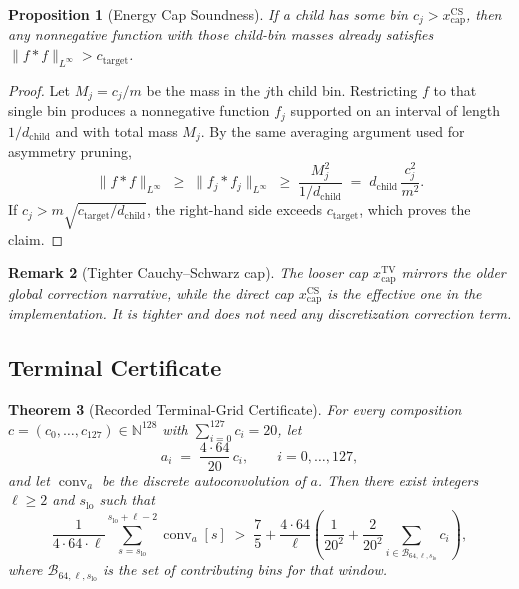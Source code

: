 \documentclass[11pt, letterpaper]{article}
\theoremstyle{paperplain}
\newtheorem{theorem}{Theorem}[section]
\newtheorem{proposition}[theorem]{Proposition}
\theoremstyle{paperdef}
\newtheorem{remark}[theorem]{Remark}
\newcommand{\N}{\mathbb{N}}
\newcommand{\conv}{\operatorname{conv}}
\begin{document}
\begin{proposition}[Energy Cap Soundness]
If a child has some bin $c_j > x_{\mathrm{cap}}^{\mathrm{CS}}$, then
any nonnegative function with those child-bin masses already satisfies
$\|f*f\|_{L^\infty} > c_{\mathrm{target}}$.
\end{proposition}

\begin{proof}
Let $M_j = c_j/m$ be the mass in the $j$th child bin.  Restricting $f$
to that single bin produces a nonnegative function $f_j$ supported on
an interval of length $1/d_{\text{child}}$ and with total mass $M_j$.
By the same averaging argument used for asymmetry pruning,
\[
  \|f*f\|_{L^\infty}
  \;\ge\;
  \|f_j*f_j\|_{L^\infty}
  \;\ge\;
  \frac{M_j^2}{1/d_{\text{child}}}
  \;=\;
  d_{\text{child}}\,\frac{c_j^2}{m^2}.
\]
If
$c_j > m \sqrt{c_{\mathrm{target}}/d_{\text{child}}}$,
the right-hand side exceeds $c_{\mathrm{target}}$, which proves the
claim.
\end{proof}

\begin{remark}[Tighter Cauchy--Schwarz cap]
The looser cap $x_{\text{cap}}^{\mathrm{TV}}$ mirrors the older global
correction narrative, while the direct cap
$x_{\text{cap}}^{\mathrm{CS}}$ is the effective one in the
implementation.  It is tighter and does not need any discretization
correction term.
\end{remark}

\subsection{Terminal Certificate}

\begin{theorem}[Recorded Terminal-Grid Certificate]
\label{thm:cascade-sound}
For every composition $c = (c_0,\ldots,c_{127}) \in \N^{128}$ with
$\sum_{i=0}^{127} c_i = 20$, let
\[
  a_i \;=\; \frac{4 \cdot 64}{20}\, c_i,
  \qquad i = 0,\ldots,127,
\]
and let $\conv_a$ be the discrete autoconvolution of $a$.  Then there
exist integers $\ell \ge 2$ and
$s_{\mathrm{lo}}$ such that
\[
  \frac{1}{4 \cdot 64 \cdot \ell}
  \sum_{s=s_{\mathrm{lo}}}^{s_{\mathrm{lo}}+\ell-2} \conv_a[s]
  \;>\;
  \frac75
  +
  \frac{4 \cdot 64}{\ell}
  \left(
    \frac{1}{20^2}
    +
    \frac{2}{20^2}
    \sum_{i \in \mathcal{B}_{64,\ell,s_{\mathrm{lo}}}} c_i
  \right),
\]
where $\mathcal{B}_{64,\ell,s_{\mathrm{lo}}}$ is the set of contributing
bins for that window.
\end{theorem}
\end{document}
